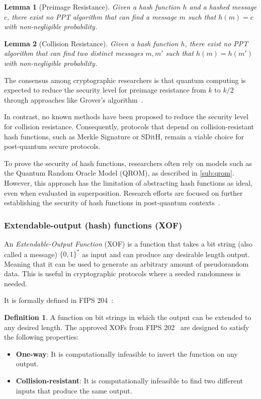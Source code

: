 \documentclass[11pt]{report}
\theoremstyle{definition}
\newtheorem{definition}{Definition}[section]
\theoremstyle{plain}
\newtheorem{lemma}{Lemma}[section]
\begin{document}
\begin{lemma}[Preimage Resistance]\label{lem:preimage}
  Given a hash function $h$ and a hashed message $c$, there exist no PPT algorithm that can find a message $m$ such that $h(m) = c$ with non-negligible probability.
\end{lemma}

\begin{lemma}[Collision Resistance]\label{lem:collision}
  Given a hash function $h$, there exist no PPT algorithm that can find two distinct messages $m, m'$ such that $h(m) = h(m')$ with non-negligible probability.
\end{lemma}

The consensus among cryptographic researchers is that quantum computing is expected to reduce the security level for preimage resistance from $k$ to $k/2$ through approaches like Grover's algorithm~\cite{nielsen2010quantumgrover}.

In contrast, no known methods have been proposed to reduce the security level for collision resistance. Consequently, protocols that depend on collision-resistant hash functions, such as Merkle Signature or SDitH, remain a viable choice for post-quantum secure protocols.

To prove the security of hash functions, researchers often rely on models such as the Quantum Random Oracle Model (QROM), as described in \autoref{sub:qrom}. However, this approach has the limitation of abstracting hash functions as ideal, even when evaluated in superposition. Research efforts are focused on further establishing the security of hash functions in post-quantum contexts~\cite{dtuPostquantumSecurity}.


\subsubsection{Extendable-output (hash) functions (XOF)}\label{sec:xof}
An \textit{Extendable-Output Function} (XOF) is a function that takes a bit string (also called a message) $\{0,1\}^*$ as input and can produce any desirable length output. Meaning that it can be used to generate an arbitrary amount of pseudorandom data. This is useful in cryptographic protocols where a seeded randomness is needed.

It is formally defined in FIPS 204~\cite{FIPS204_2024}:
\begin{definition}
  A function on bit strings in which the output can be extended to any desired length. The approved XOFs from FIPS 202~\cite{FIPS202_2015} are designed to satisfy the following properties:
  \begin{itemize}
    \item \textbf{One-way}: It is computationally infeasible to invert the function on any output.
    \item \textbf{Collision-resistant}: It is computationally infeasible to find two different inputs that produce the same output.
  \end{itemize}
\end{definition}
\end{document}
